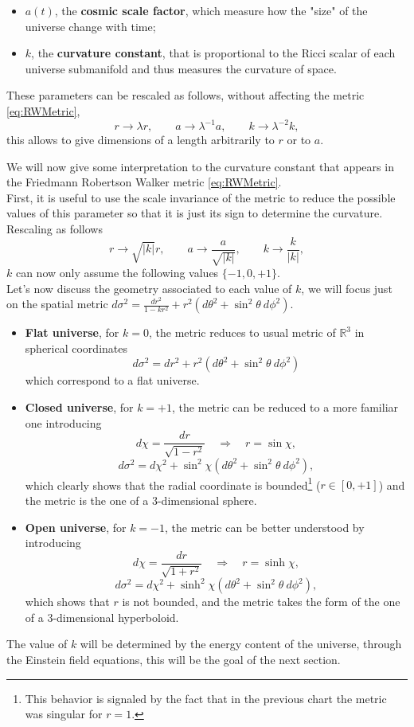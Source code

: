 \begin{itemize}
    \item $a(t)$, the \textbf{cosmic scale factor}, which measure how the "size" of the universe change with time;
    \item $k$, the \textbf{curvature constant}, that is proportional to the Ricci scalar of each universe submanifold and thus measures the curvature of space.
\end{itemize}
These parameters can be rescaled as follows, without affecting the metric \eqref{eq:RWMetric},
\begin{equation*}
    r\rightarrow\lambda r,\qquad a\rightarrow\lambda^{-1} a,\qquad k\rightarrow\lambda^{-2} k,
\end{equation*}
this allows to give dimensions of a length arbitrarily to $r$ or to $a$.

We will now give some interpretation to the curvature constant that appears in the Friedmann Robertson Walker metric \eqref{eq:RWMetric}.\\First, it is useful to use the scale invariance of the metric to reduce the possible values of this parameter so that it is just its sign to determine the curvature. Rescaling as follows 
\begin{equation*}
    r\rightarrow\sqrt{|k|}r,\qquad a\rightarrow\frac{a}{\sqrt{|k|}},\qquad k\rightarrow\frac{k}{|k|},
\end{equation*}  
$k$ can now only assume the following values $\{-1,0,+1\}$. \\
Let's now discuss the geometry associated to each value of $k$, we will focus just on the spatial metric $d\sigma^2=\frac{dr^2}{1-kr^2}+r^2(d\theta^2+\sin^2\theta\ d\phi^2)$.
\begin{itemize}
    \item \textbf{Flat universe}, for $k=0$, the metric reduces to usual metric of $\mathbb{R}^3$ in spherical coordinates $$d\sigma^2= dr^2+r^2(d\theta^2+\sin^2\theta\ d\phi^2)$$ which correspond to a flat universe.
    \item \textbf{Closed universe}, for $k=+1$, the metric can be reduced to a more familiar one introducing $$d\chi=\frac{dr}{\sqrt{1-r^2}}\quad\Rightarrow\quad r=\sin\chi,$$$$d\sigma^2=d\chi^2+\sin^2\chi(d\theta^2+\sin^2\theta\ d\phi^2),$$which clearly shows that the radial coordinate is bounded\footnote{This behavior is signaled by the fact that in the previous chart the metric was singular for $r=1$.} ($r\in[0,+1]$) and the metric is the one of a $3$-dimensional sphere.
    \item \textbf{Open universe}, for $k=-1$, the metric can be better understood by introducing$$d\chi=\frac{dr}{\sqrt{1+r^2}}\quad\Rightarrow\quad r=\sinh\chi,$$$$d\sigma^2=d\chi^2+\sinh^2\chi(d\theta^2+\sin^2\theta\ d\phi^2),$$ which shows that $r$ is not bounded, and the metric takes the form of the one of a $3$-dimensional hyperboloid.
\end{itemize}
The value of $k$ will be determined by the energy content of the universe, through the Einstein field equations, this will be the goal of the next section.

